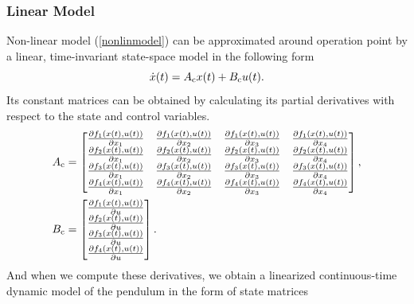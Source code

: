 \subsubsection{Linear Model}
Non-linear model (\ref{nonlinmodel}) can be approximated around operation point by a linear, time-invariant state-space model in the following form
\begin{equation}\dot{x}(t) = A _{\text{c}}x(t) + B _{\text{c}}u(t).\end{equation}
Its constant matrices can be obtained by calculating its partial derivatives with respect to the state and control variables.
\begin{subequations}\label{linSSmodel:general}
	\begin{align}
	A _{\text{c}} &= \begin{bmatrix}
	\frac{\partial f_1(x(t),u(t))}{\partial x_1}&\frac{\partial f_1(x(t),u(t))}{\partial x_2}&\frac{\partial f_1(x(t),u(t))}{\partial x_3}&\frac{\partial f_1(x(t),u(t))}{\partial x_4}\\
	\frac{\partial f_2(x(t),u(t))}{\partial x_1}&\frac{\partial f_2(x(t),u(t))}{\partial x_2}&\frac{\partial f_2(x(t),u(t))}{\partial x_3}&\frac{\partial f_2(x(t),u(t))}{\partial x_4}\\
	\frac{\partial f_3(x(t),u(t))}{\partial x_1}&\frac{\partial f_3(x(t),u(t))}{\partial x_2}&\frac{\partial f_3(x(t),u(t))}{\partial x_3}&\frac{\partial f_3(x(t),u(t))}{\partial x_4}\\
	\frac{\partial f_4(x(t),u(t))}{\partial x_1}&\frac{\partial f_4(x(t),u(t))}{\partial x_2}&\frac{\partial f_4(x(t),u(t))}{\partial x_3}&\frac{\partial f_4(x(t),u(t))}{\partial x_4}
	\end{bmatrix},\\ 
	B _{\text{c}} &= \begin{bmatrix}
	\frac{\partial f_1(x(t),u(t))}{\partial u}\\\frac{\partial f_2(x(t),u(t))}{\partial u}\\\frac{\partial f_3(x(t),u(t))}{\partial u}\\\frac{\partial f_4(x(t),u(t))}{\partial u}
	\end{bmatrix}.
	\end{align}
\end{subequations}
And when we compute these derivatives, we obtain a linearized continuous-time dynamic model of the pendulum in the form of state matrices
